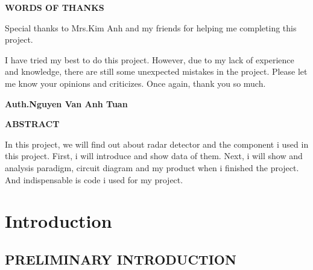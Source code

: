 \documentclass[13pt,a4paper]{report}
\begin{document}
    \newpage
    \thispagestyle{plain}
    \centering
    \centerline{\textbf{\huge{WORDS OF THANKS}}}
    \vspace{10mm}
    \begin{flushleft}
        Special thanks to Mrs.Kim Anh and my friends for helping me completing this 
        project.\\
        \vspace{2mm}
        \par I have tried my best to do this project. However, due to my lack of experience and 
        knowledge, there are still some unexpected mistakes in the project. Please let me know your opinions and criticizes.
        Once again, thank you so much. 
    \end{flushleft}
    \begin{flushright}
        \textbf{Auth.Nguyen Van Anh Tuan}
    \end{flushright}

    \newpage
    \tableofcontents

    \newpage
    \thispagestyle{plain}
    \centering
    \centerline{\textbf{\huge{ABSTRACT}}}
    \vspace{10mm}
    \begin{flushleft}
        In this project, we will find out about radar detector and the component i used in this 
        project. First, i will introduce and show data of them. Next, i will show and analysis 
        paradigm, circuit diagram and my product when i finished the project. And 
        indispensable is code i used for my project.
    \end{flushleft}

    \chapter{Introduction}
    \renewcommand{\headrulewidth}{0.5pt}
    \renewcommand{\footrulewidth}{0.5pt}
    \thispagestyle{fancy}
    \fancyhf{}
    \raggedright
    \section{PRELIMINARY INTRODUCTION}
\end{document}
